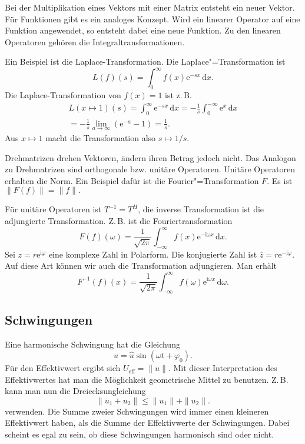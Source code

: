 \documentclass[a4paper,11pt,fleqn,twocolumn,twoside]{scrartcl}
\numberwithin{equation}{section}
\newcommand{\ui}{\mathrm i}
\newcommand{\ee}{\mathrm e}
\begin{document}
Bei der Multiplikation eines Vektors mit einer Matrix entsteht ein
neuer Vektor. Für Funktionen gibt es ein analoges Konzept. Wird ein
linearer Operator auf eine Funktion angewendet, so entsteht dabei
eine neue Funktion. Zu den linearen Operatoren gehören die
Integraltransformationen.

Ein Beispiel ist die Laplace-Transformation.
Die Laplace"=Transformation ist
\begin{equation}
L(f)(s) = \int_0^{\infty} f(x)\ee^{-sx}\,\mathrm dx.
\end{equation}
Die Laplace-Transformation von $f(x)=1$ ist z.\,B.
\begin{gather*}
L(x\mapsto 1)(s) = \int_0^{\infty} \ee^{-sx}\,\mathrm dx
= -\frac{1}{s} \int_0^{-\infty} \ee^x\,\mathrm dx\\
= -\frac{1}{s} \lim_{a\rightarrow\infty} (\ee^{-a}-1)
= \frac{1}{s}.
\end{gather*}
Aus $x\mapsto 1$ macht die Transformation also
$s\mapsto 1/s$.

Drehmatrizen drehen Vektoren, ändern ihren Betrag jedoch nicht.
Das Analogon zu Drehmatrizen sind orthogonale bzw. unitäre Operatoren.
Unitäre Operatoren erhalten die Norm. Ein Beispiel dafür ist die
Fourier"=Transformation $F$. Es ist $\|F(f)\| = \|f\|.$

Für unitäre Operatoren ist $T^{-1}=T^H$, die inverse Transformation
ist die adjungierte Transformation. Z.\,B. ist die Fouriertransformation
\begin{equation}
F(f)(\omega) = \frac{1}{\sqrt{2\pi}}
\int_{-\infty}^{\infty} f(x)\ee^{-\ui \omega x}\,\mathrm dx.
\end{equation}
Sei $z=r\ee^{\ui\varphi}$ eine komplexe Zahl in Polarform.
Die konjugierte Zahl ist
$\overline z = r\ee^{-\ui\varphi}$. Auf diese Art können wir auch
die Transformation adjungieren. Man erhält
\begin{equation}
F^{-1}(f)(x) = \frac{1}{\sqrt{2\pi}}
\int_{-\infty}^{\infty} f(\omega)\ee^{\ui\omega x}\,\mathrm d\omega.
\end{equation}

\subsection{Schwingungen}

Eine harmonische Schwingung hat die Gleichung
\begin{equation}
u=\hat u\sin(\omega t+\varphi_0).
\end{equation}
Für den Effektivwert ergibt sich $U_\mathrm{eff} = \|u\|$.
Mit dieser Interpretation des Effektivwertes hat man die Möglichkeit
geometrische Mittel zu benutzen. Z.\,B. kann man nun die
Dreiecksungleichung
\begin{equation}
\|u_1+u_2\| \le \|u_1\|+\|u_2\|.
\end{equation}
verwenden. Die Summe zweier Schwingungen wird immer einen kleineren
Effektivwert haben, als die Summe der Effektivwerte der Schwingungen.
Dabei scheint es egal zu sein, ob diese Schwingungen harmonisch sind
oder nicht.
\end{document}
